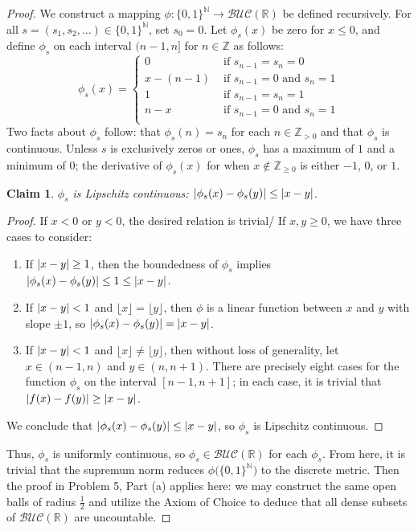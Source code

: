 \documentclass[11pt]{article}
\newtheorem{claim}{Claim}
\begin{document}
\begin{proof}
  We construct a mapping $\phi : \{ 0, 1 \}^{\mathbb{N}} \to \mathcal{BUC}(\mathbb{R})$ be defined recursively. For all $s = (s_{1}, s_{2}, \ldots) \in \{ 0, 1 \}^{\mathbb{N}}$, set $s_{0} = 0$. Let $\phi_{s}(x)$ be zero for $x \le 0$, and define $\phi_{s}$ on each interval $(n - 1, n]$ for $n \in \mathbb{Z}$ as follows:
  \[
    \phi_{s}(x) = \begin{cases}
      0 &\text{ if } s_{n - 1} = s_{n} = 0 \\
      x - (n - 1) & \text{ if } s_{n - 1} = 0 \text{ and } s_{n} = 1 \\
      1 &\text{ if } s_{n - 1} = s_{n} = 1 \\
      n - x & \text{ if } s_{n - 1} = 0 \text{ and } s_{n} = 1 \\
    \end{cases}
  \]
  Two facts about $\phi_{s}$ follow: that $\phi_{s}(n) = s_{n}$ for each $n \in \mathbb{Z}_{> 0}$ and that $\phi_{s}$ is continuous. Unless $s$ is exclusively zeros or ones, $\phi_{s}$ has a maximum of $1$ and a minimum of $0$; the derivative of $\phi_{s}(x)$ for when $x \notin \mathbb{Z}_{\ge 0}$ is either $-1$, $0$, or $1$.
  \begin{claim}
    $\phi_{s}$ is Lipschitz continuous: $\abs{\phi_{s}(x) - \phi_{s}(y)} \le \abs{x - y}$.
  \end{claim}
  \begin{adjustwidth}{1cm}{}
    \begin{proof}\renewcommand{\qedsymbol}{}
      If $x < 0$ or $y < 0$, the desired relation is trivial/ If $x, y \ge 0$, we have three cases to consider:
      \begin{enumerate}
        \item  If $\abs{x - y} \ge 1$, then the boundedness of $\phi_{s}$ implies $\abs{\phi_{s}(x) - \phi_{s}(y)} \le 1 \le \abs{x - y}$. 
        \item If $\abs{x - y} < 1$ and $\lfloor x \rfloor = \lfloor y \rfloor$, then $\phi$ is a linear function between $x$ and $y$ with slope $\pm 1$, so $\abs{\phi_{s}(x) - \phi_{s}(y)} = \abs{x - y}$.
        \item If $\abs{x - y} < 1$ and $\lfloor x \rfloor \ne \lfloor y \rfloor$, then without loss of generality, let $x \in (n - 1, n)$ and $y \in (n, n + 1)$. There are precisely eight cases for the function $\phi_{s}$ on the interval $[n - 1, n + 1]$; in each case, it is trivial that $\abs{f(x) - f(y)} \ge \abs{x - y}$.
      \end{enumerate}
      We conclude that $\abs{\phi_{s}(x) - \phi_{s}(y)} \le \abs{x - y}$, so $\phi_{s}$ is Lipschitz continuous.
    \end{proof}
  \end{adjustwidth}
  Thus, $\phi_{s}$ is uniformly continuous, so $\phi_{s} \in \mathcal{BUC}(\mathbb{R})$ for each $\phi_{s}$. From here, it is trivial that the supremum norm reduces $\phi \big( \{ 0, 1 \}^{\mathbb{N}} \big)$ to the discrete metric. Then the proof in Problem 5, Part (a) applies here: we may construct the same open balls of radius $\tfrac{1}{2}$ and utilize the Axiom of Choice to deduce that all dense subsets of $\mathcal{BUC}(\mathbb{R})$ are uncountable.
\end{proof}

\end{document}
